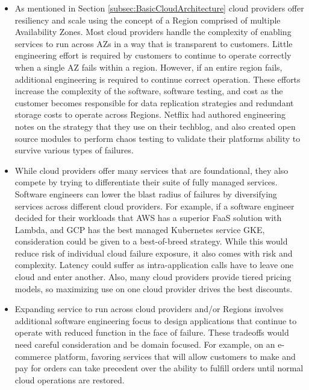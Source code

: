 \documentclass[conference]{IEEEconf}
\begin{document}
\begin{itemize}
	\item As mentioned in Section \ref{subsec:BasicCloudArchitecture} cloud providers offer resiliency and scale using the concept of a Region comprised of multiple Availability Zones.  Most cloud providers handle the complexity of enabling services to run across AZs in a way that is transparent to customers.  Little engineering effort is required by customers to continue to operate correctly when a single AZ fails within a region.  However, if an entire region fails, additional engineering is required to continue correct operation. These efforts increase the complexity of the software, software testing, and cost as the customer becomes responsible for data replication strategies and redundant storage costs to operate across Regions. Netflix had authored engineering notes on the strategy that they use on their techblog\cite{NetflixMultiRegion}, and also created open source modules to perform chaos testing to validate their platforms ability to survive various types of failures. 
	
	\item While cloud providers offer many services that are foundational, they also compete by trying to differentiate their suite of fully managed services.  Software engineers can lower the blast radius of failures by diversifying services across different cloud providers.  For example, if a software engineer decided for their workloads that AWS has a superior FaaS solution with Lambda, and GCP has the best managed Kubernetes service GKE, consideration could be given to a best-of-breed strategy.  While this would reduce risk of individual cloud failure exposure, it also comes with risk and complexity.  Latency could suffer as intra-application calls have to leave one cloud and enter another.  Also, many cloud providers provide tiered pricing models, so maximizing use on one cloud provider drives the best discounts.  
	
	\item Expanding service to run across cloud providers and/or Regions involves additional software engineering focus to design applications that continue to operate with reduced function in the face of failure.  These tradeoffs would need careful consideration and be domain focused.  For example, on an e-commerce platform, favoring services that will allow customers to make and pay for orders can take precedent over the ability to fulfill orders until normal cloud operations are restored. 
	

\end{itemize}
\end{document}
